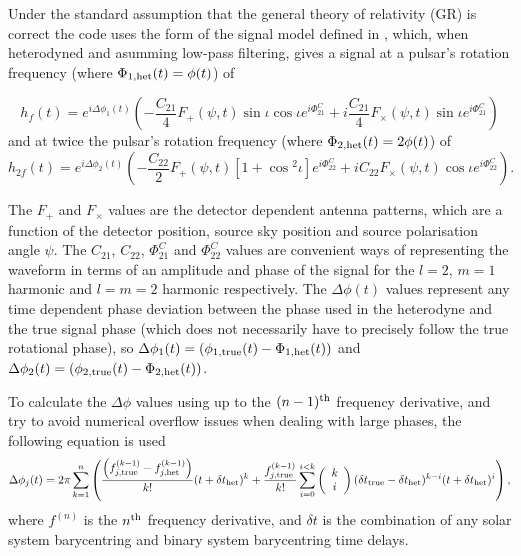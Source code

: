 Under the standard assumption that the general theory of relativity (GR) is correct the code uses the form of
the signal model defined in \citet{2015arXiv150105832J}, which, when heterodyned and asumming low-pass
filtering, gives a signal at a pulsar's rotation frequency (where $\Phi_{1,{\rm het}}(t) = \phi(t)$) of
\begin{widetext}
\begin{equation}\label{eq:hf}
h_f(t) =  e^{i\Delta\phi_1(t)}\left(-\frac{C_{21}}{4}F_{+}(\psi,t)\sin{\iota}\cos{\iota}e^{i\Phi_{21}^C} +
i\frac{C_{21}}{4}F_{\times}(\psi,t)\sin{\iota}e^{i\Phi_{21}^C} \right)
\end{equation}
and at twice the pulsar's rotation frequency (where $\Phi_{2,{\rm het}}(t) = 2\phi(t)$) of
\begin{equation}\label{eq:h2f}
h_{2f}(t) =  e^{i\Delta\phi_2(t)}\left(-\frac{C_{22}}{2}F_{+}(\psi,t)[1+\cos{}^2\iota]e^{i\Phi_{22}^C} +
iC_{22}F_{\times}(\psi,t)\cos{\iota}e^{i\Phi_{22}^C} \right).
\end{equation}
\end{widetext}
The $F_{+}$ and $F_{\times}$ values are the detector dependent antenna patterns, which are a function of the
detector position, source sky position and source polarisation angle $\psi$. The $C_{21}$, $C_{22}$,
$\Phi_{21}^C$ and $\Phi_{22}^C$ values are convenient ways of representing the waveform in terms of an
amplitude and phase of the signal for the $l=2$, $m=1$ harmonic and $l=m=2$ harmonic respectively. The
$\Delta\phi(t)$ values represent any time dependent phase deviation between the phase used in the heterodyne
and the true signal phase (which does not necessarily have to precisely follow the true rotational phase), so
$\Delta\phi_1(t) = (\phi_{1,{\rm true}}(t)-\Phi_{1,{\rm het}}(t))$ and $\Delta\phi_2(t) = (\phi_{2,{\rm
true}}(t)-\Phi_{2,{\rm het}}(t))$.

To calculate the $\Delta\phi$ values using up to the $(n-1)^{\rm th}$ frequency derivative, and try to avoid numerical overflow issues when dealing with large
phases, the following equation is used
\begin{equation}
\Delta\phi_j(t) = 2\pi \sum_{k=1}^n \left( \frac{\left(f^{(k-1)}_{j,{\rm true}} - f^{(k-1)}_{j,{\rm het}}\right)}{k!}(t+\delta t_{\rm het})^k + \frac{f^{(k-1)}_{j,{\rm true}}}{k!} \sum_{i=0}^{i<k} \left(\begin{array}{c}k \\ i\end{array} \right) (\delta t_{\rm true}-\delta t_{\rm het})^{k-i} (t+\delta t_{\rm het})^i \right),
\end{equation}
where $f^{(n)}$ is the $n^{\rm th}$ frequency derivative, and $\delta t$ is the combination of any solar system barycentring and binary system
barycentring time delays.

